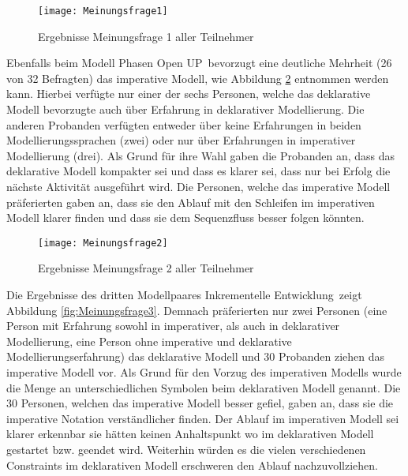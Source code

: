 \begin{figure}[htp]
\begin{center}
  \texttt{[image: Meinungsfrage1]} %
  \caption{Ergebnisse Meinungsfrage 1 aller Teilnehmer}
  \label{fig:Meinungsfrage1}
\end{center}
\end{figure}

Ebenfalls beim Modell \grqq Phasen Open UP\grqq \ bevorzugt eine deutliche Mehrheit (26 von 32 Befragten) das imperative Modell, wie Abbildung \ref{fig:Meinungsfrage2} entnommen werden kann. \newline
Hierbei verfügte nur einer der sechs Personen, welche das deklarative Modell bevorzugte auch über Erfahrung in deklarativer Modellierung. Die anderen Probanden verfügten entweder über keine Erfahrungen in beiden Modellierungssprachen (zwei) oder nur über Erfahrungen in imperativer Modellierung (drei). Als Grund für ihre Wahl gaben die Probanden an, dass das deklarative Modell kompakter sei und dass es klarer sei, dass nur bei Erfolg die nächste Aktivität ausgeführt wird.\newline
Die Personen, welche das imperative Modell präferierten gaben an, dass sie den Ablauf mit den Schleifen im imperativen Modell klarer finden und dass sie dem Sequenzfluss besser folgen könnten.\newline


\begin{figure}[htp]
\begin{center}
  \texttt{[image: Meinungsfrage2]} %
  \caption{Ergebnisse Meinungsfrage 2 aller Teilnehmer}
  \label{fig:Meinungsfrage2}
\end{center}
\end{figure}

Die Ergebnisse des dritten Modellpaares \grqq Inkrementelle Entwicklung\grqq \ zeigt Abbildung \ref{fig:Meinungsfrage3}. Demnach präferierten nur zwei Personen (eine Person mit Erfahrung sowohl in imperativer, als auch in deklarativer Modellierung, eine Person ohne imperative und deklarative Modellierungserfahrung) das deklarative Modell und 30 Probanden ziehen das imperative Modell vor.\newline
Als Grund für den Vorzug des imperativen Modells wurde die Menge an unterschiedlichen Symbolen beim deklarativen Modell genannt. \newline
Die 30 Personen, welchen das imperative Modell besser gefiel, gaben an, dass sie die imperative Notation verständlicher finden. Der Ablauf im imperativen Modell sei klarer erkennbar sie hätten keinen Anhaltspunkt wo im deklarativen Modell gestartet bzw. geendet wird. Weiterhin würden es die vielen verschiedenen Constraints im deklarativen Modell erschweren den Ablauf nachzuvollziehen.\newline


